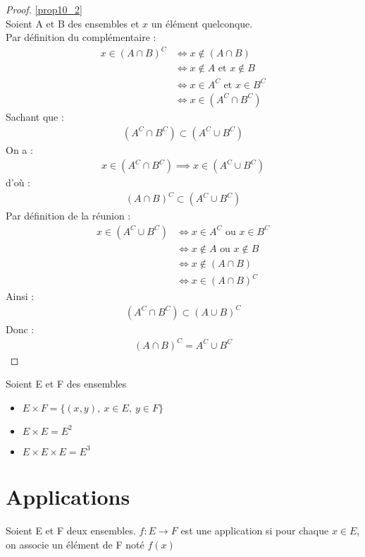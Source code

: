 \begin{proof}
	\ref{prop10_2} 
	\\
	Soient A et B des ensembles et $x$ un élément quelconque. \\
	\framebox{$\subset$} Par définition du complémentaire :
	\begin{align*}
		x \in (A \cap B)^C &\iff x \notin (A \cap B) \\ 
		&\iff x \notin A \text{ et } x \notin B \\
		&\iff x \in A^C \text{ et } x \in B^C \\
		&\iff x \in (A^C \cap B^C)
	\end{align*}
	Sachant que :
	\begin{align*}
		(A^C \cap B^C) \subset (A^C \cup B^C)
	\end{align*}
	On a :
	\begin{align*}
		x \in (A^C \cap B^C) \implies x \in (A^C \cup B^C)
	\end{align*}
	d'où :
	\begin{align*}
		(A \cap B)^C \subset (A^C \cup B^C)
	\end{align*}
	\framebox{$\supset$} Par définition de la réunion :
	\begin{align*}
		x \in (A^C \cup B^C) &\iff x \in A^C \text{ ou } x \in B^C \\
		&\iff x \notin A \text{ ou } x \notin B \\
		&\iff x \notin (A \cap B) \\
		&\iff x \in (A \cap B)^C
	\end{align*}
	Ainsi : 
	\begin{align*}
		(A^C \cap B^C) \subset (A \cup B)^C
	\end{align*}
	Donc :
	\begin{align*}
		(A \cap B)^C = A^C \cup B^C
	\end{align*}
\end{proof}

    \begin{definition}
	Soient E et F des ensembles
    \begin{itemize}
        \item $E \times F = \{(x, y),\ x \in E,\ y \in F\} $
        \item $E \times E = E^2$
        \item $E \times E \times E = E^3$
    \end{itemize}
\end{definition}
\section{Applications}
    \begin{definition}[Application]
	Soient E et F deux ensembles. $f:E \to F$ est une application si pour chaque $x \in E$, on associe un élément de F noté $f(x)$
\end{definition}


